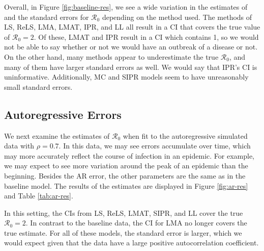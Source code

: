 \documentclass[12pt]{article}
\newcommand{\rr}{\ensuremath{\mathcal{R}_0}}
\begin{document}
Overall, in Figure \ref{fig:baseline-res}, we see a wide variation in the estimates of and the standard errors for $\rr$ depending on the method used.  The methods of LS, ReLS, LMA, LMAT, IPR, and LL all result in a CI that covers the true value of $\rr=2$.  Of these, LMAT and IPR result in a CI which contains 1, so we would not be able to say whether or not we would have an outbreak of a disease or not. On the other hand, many methods appear to underestimate the true $\rr$, and many of them have larger standard errors as well.  We would say that IPR's CI is uninformative. Additionally, MC and SIPR models seem to have unreasonably small standard errors.





\subsection{Autoregressive Errors}\label{sec:res-AR}
We next examine the estimates of $\rr$ when fit to the autoregressive simulated data with $\rho=0.7$.  In this data, we may see errors accumulate over time, which may more accurately reflect the course of infection in an epidemic.  For example, we may expect to see more variation around the peak of an epidemic than the beginning.  Besides the AR error, the other parameters are the same as in the baseline model.  The results of the estimates are displayed in Figure \ref{fig:ar-res} and Table \ref{tab:ar-res}.

In this setting, the CIs from LS, ReLS, LMAT, SIPR, and LL cover the true $\rr=2$.  In contrast to the baseline data, the CI for LMA no longer covers the true estimate.  For all of these models, the standard error is larger, which we would expect given that the data have a large positive autocorrelation coefficient.
\end{document}
